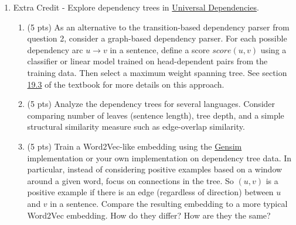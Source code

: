 \documentclass{article}
\begin{document}
\begin{enumerate}
    \item Extra Credit - Explore dependency trees in \href{https://universaldependencies.org/}{Universal Dependencies}.
    \begin{enumerate}
        \item (5 pts) As an alternative to the transition-based dependency parser from question 2, consider a graph-based dependency parser. For each possible dependency arc $u \to v$ in a sentence, define a score $score(u,v)$ using a classifier or linear model trained on head-dependent pairs from the training data. Then select a maximum weight spanning tree. See section \href{https://web.stanford.edu/~jurafsky/slp3/19.pdf}{19.3} of the textbook for more details on this approach.

        \item (5 pts) Analyze the dependency trees for several languages. Consider comparing number of leaves (sentence length), tree depth, and a simple structural similarity measure such as edge-overlap similarity.
        
        \item (5 pts) Train a Word2Vec-like embedding using the \href{https://radimrehurek.com/gensim/models/word2vec.html}{Gensim} implementation or your own implementation on dependency tree data. In particular, instead of considering positive examples based on a window around a given word, focus on connections in the tree. So $(u, v)$ is a positive example if there is an edge (regardless of direction) between $u$ and $v$ in a sentence. Compare the resulting embedding to a more typical Word2Vec embedding. How do they differ? How are they the same?
    \end{enumerate}
\end{enumerate}
\end{document}
